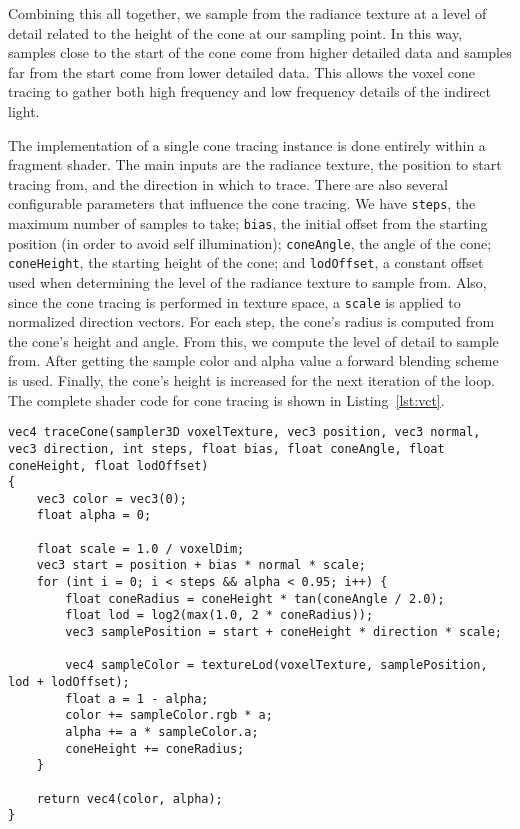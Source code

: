 Combining this all together, we sample from the radiance texture at a level of detail related to the height of the cone at our sampling point. In this way, samples close to the start of the cone come from higher detailed data and samples far from the start come from lower detailed data. This allows the voxel cone tracing to gather both high frequency and low frequency details of the indirect light.

The implementation of a single cone tracing instance is done entirely within a fragment shader. The main inputs are the radiance texture, the position to start tracing from, and the direction in which to trace. There are also several configurable parameters that influence the cone tracing. We have \texttt{steps}, the maximum number of samples to take; \texttt{bias}, the initial offset from the starting position (in order to avoid self illumination); \texttt{coneAngle}, the angle of the cone; \texttt{coneHeight}, the starting height of the cone; and \texttt{lodOffset}, a constant offset used when determining the level of the radiance texture to sample from. Also, since the cone tracing is performed in texture space, a \texttt{scale} is applied to normalized direction vectors. For each step, the cone's radius is computed from the cone's height and angle. From this, we compute the level of detail to sample from. After getting the sample color and alpha value a forward blending scheme is used. Finally, the cone's height is increased for the next iteration of the loop. The complete shader code for cone tracing is shown in Listing~\ref{lst:vct}.

\begin{lstlisting}[caption={Shader function for performing voxel cone tracing.},label={lst:vct}]
vec4 traceCone(sampler3D voxelTexture, vec3 position, vec3 normal, vec3 direction, int steps, float bias, float coneAngle, float coneHeight, float lodOffset)
{
    vec3 color = vec3(0);
    float alpha = 0;

    float scale = 1.0 / voxelDim;
    vec3 start = position + bias * normal * scale;
    for (int i = 0; i < steps && alpha < 0.95; i++) {
        float coneRadius = coneHeight * tan(coneAngle / 2.0);
        float lod = log2(max(1.0, 2 * coneRadius));
        vec3 samplePosition = start + coneHeight * direction * scale;

        vec4 sampleColor = textureLod(voxelTexture, samplePosition, lod + lodOffset);
        float a = 1 - alpha;
        color += sampleColor.rgb * a;
        alpha += a * sampleColor.a;
        coneHeight += coneRadius;
    }

    return vec4(color, alpha);
}
\end{lstlisting}

